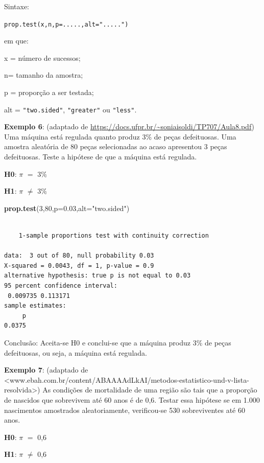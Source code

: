 \documentclass[12pt,brazil,oneside]{book}
\newenvironment{Shaded}{\begin{snugshade}}{\end{snugshade}}
\newcommand{\DataTypeTok}[1]{\textcolor[rgb]{0.13,0.29,0.53}{#1}}
\newcommand{\DecValTok}[1]{\textcolor[rgb]{0.00,0.00,0.81}{#1}}
\newcommand{\FloatTok}[1]{\textcolor[rgb]{0.00,0.00,0.81}{#1}}
\newcommand{\KeywordTok}[1]{\textcolor[rgb]{0.13,0.29,0.53}{\textbf{#1}}}
\newcommand{\NormalTok}[1]{#1}
\newcommand{\StringTok}[1]{\textcolor[rgb]{0.31,0.60,0.02}{#1}}
\begin{document}
Sintaxe:

\texttt{prop.test(x,n,p=.....,alt=".....")}

em que:

x = número de sucessos;

n= tamanho da amostra;

p = proporção a ser testada;

alt = \texttt{"two.sided"}, \texttt{"greater"} ou \texttt{"less"}.

\textbf{Exemplo 6}: (adaptado de
\url{https://docs.ufpr.br/~soniaisoldi/TP707/Aula8.pdf}) Uma máquina
está regulada quanto produz 3\% de peças defeituosas. Uma amostra
aleatória de 80 peças selecionadas ao acaso apresentou 3 peças
defeituosas. Teste a hipótese de que a máquina está regulada.

\textbf{H0}: \(\pi\) \(=\) 3\%

\textbf{H1}: \(\pi\) \(\neq\) 3\%

\begin{Shaded}
\begin{Highlighting}[]
\KeywordTok{prop.test}\NormalTok{(}\DecValTok{3}\NormalTok{,}\DecValTok{80}\NormalTok{,}\DataTypeTok{p=}\FloatTok{0.03}\NormalTok{,}\DataTypeTok{alt=}\StringTok{"two.sided"}\NormalTok{)}
\end{Highlighting}
\end{Shaded}

\begin{verbatim}

    1-sample proportions test with continuity correction

data:  3 out of 80, null probability 0.03
X-squared = 0.0043, df = 1, p-value = 0.9
alternative hypothesis: true p is not equal to 0.03
95 percent confidence interval:
 0.009735 0.113171
sample estimates:
     p 
0.0375 
\end{verbatim}

Conclusão: Aceita-se H0 e conclui-se que a máquina produz 3\% de peças
defeituosas, ou seja, a máquina está regulada.

\textbf{Exemplo 7}: (adaptado de
\textless{}www.ebah.com.br/content/ABAAAAdLkAI/metodos-estatistico-und-v-lista-resolvida\textgreater{})
As condições de mortalidade de uma região são tais que a proporção de
nascidos que sobrevivem até 60 anos é de 0,6. Testar essa hipótese se em
1.000 nascimentos amostrados aleatoriamente, verificou-se 530
sobreviventes até 60 anos.

\textbf{H0}: \(\pi\) \(=\) 0,6

\textbf{H1}: \(\pi\) \(\neq\) 0,6
\end{document}
